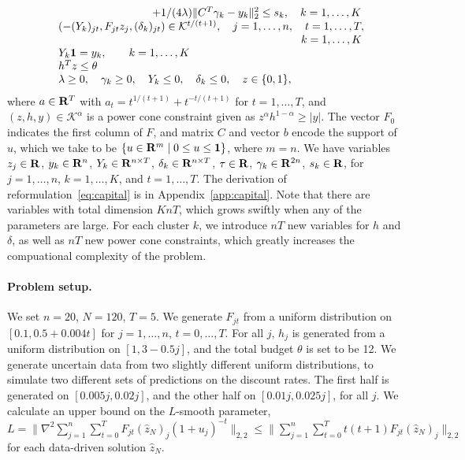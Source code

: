 {\begin{equation}
\begin{array}{ll}
	& \hspace{3cm} +1/(4\lambda)\| C^T\gamma_k - y_k \|^2_2 \leq s_k, \quad k = 1,\dots,K\\
	& \left(-(Y_k)_{jt},F_{jt}z_j,(\delta_k)_{jt}\right) \in  \mathcal{K}^{t/(t+1)}, \quad j = 1,\dots,n, \quad t= 1,\dots,T,\\
	& \hspace{7.4cm} \quad k= 1,\dots,K\\
	& Y_k \ones  = y_{k}, \quad \quad k= 1,\dots,K\\
	&  h^Tz \leq \theta\\
	& \lambda \geq 0, \quad \gamma_k \geq 0, \quad Y_k \leq 0,\quad \delta_{k} \leq 0,  \quad z \in \{0,1\},
	\end{array}
\end{equation}
where $a \in {\mathbf R}^T$ with $a_t = t^{1/(t+1)} + t^{-t/(t+1)}$ for $t = 1,\dots,T$, and $(z,h,y) \in \mathcal{K}^{\alpha}$ is a power cone constraint given as $z^{\alpha} h^{1 - \alpha} \geq |y|$.
The vector $F_0$ indicates the first column of $F$, and matrix $C$ and vector $b$ encode the support of $u$, which we take to be $\{u\in {\mathbf R}^m \mid 0 \leq u \leq \mathbf 1\}$, where $m = n$.
We have variables $z_j \in {\mathbf R}$, $y_k \in {\mathbf R}^{n}$, $Y_{k} \in {\mathbf R}^{n\times T}$, $\delta_{k} \in {\mathbf R}^{n\times T}$, $\tau \in {\mathbf R}$, $\gamma_k \in {\mathbf R}^{2n}$, $s_k \in {\mathbf R}$, for $j = 1,\dots,n$, $k= 1,\dots,K$, and $t= 1,\dots,T$.
The derivation of reformulation~\eqref{eq:capital} is in Appendix~\ref{app:capital}.
Note that there are variables with total dimension $KnT$, which grows swiftly when any of the parameters are large.
For each cluster $k$, we introduce $nT$ new variables for $h$ and $\delta$, as well as $nT$ new power cone constraints, which greatly increases the compuational complexity of the problem.

\paragraph{Problem setup.}
We set $n = 20$, $N = 120$, $T= 5$. We generate $F_{jt}$ from a uniform distribution on ${[0.1,0.5+0.004t]}$ for $j = 1,\dots,n$, \quad $t = 0,\dots,T$.
For all $j$, $h_j$ is generated from a uniform distribution on $[1,3-0.5j]$, and the total budget $\theta$ is set to be 12.
We generate uncertain data from two slightly different uniform distributions, to simulate two different sets of predictions on the discount rates. The first half is generated on $[0.005j,0.02j]$, and the other half on $[0.01j,0.025j]$, for all $j$. We calculate an upper bound on the $L$-smooth parameter, ${L = \|\nabla^2 \sum_{j=1}^n \sum_{t=0}^T F_{jt}(\hat{z}_N)_j(1+u_j)^{-t} \|_{2,2} \leq  \|\sum_{j=1}^n \sum_{t=0}^T t(t+1)F_{jt}(\hat{z}_N)_j\|_{2,2}}$ for each data-driven solution $\hat{z}_N$.
\reviewChanges{
}}
